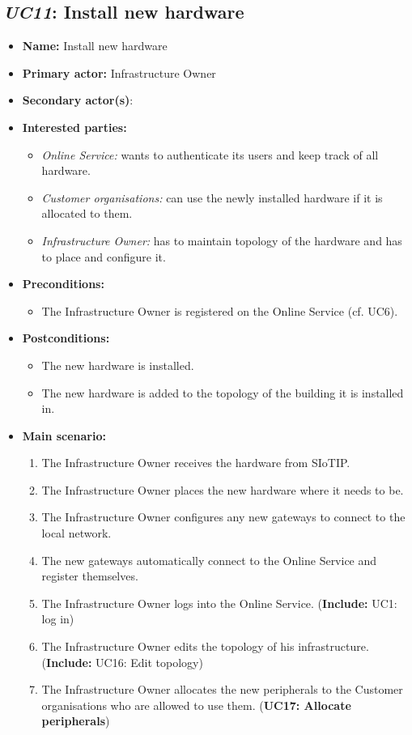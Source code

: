 \subsection{\emph{UC11}: Install new hardware}
\begin{itemize}
    \item \textbf{Name:} Install new hardware
    \item \textbf{Primary actor:} Infrastructure Owner
    \item \textbf{Secondary actor(s)}: 
    \item \textbf{Interested parties:} 
        \begin{itemize}
            \item \textit{Online Service:}  wants to authenticate its users and keep track of all hardware.
            \item \textit{Customer organisations:} can use the newly installed hardware if it is allocated to them.
            \item \textit{Infrastructure Owner:} has to maintain topology of the hardware and has to place and configure it.
        \end{itemize}

    \item \textbf{Preconditions:}
        \begin{itemize}
            \item The Infrastructure Owner is registered on the Online Service (cf. UC6).
        \end{itemize}

    \item \textbf{Postconditions:}
        \begin{itemize}
            \item The new hardware is installed.
            \item The new hardware is added to the topology of the building it is installed in.
        \end{itemize}
        
    \item \textbf{Main scenario:} 
    \begin{enumerate}
       \item The Infrastructure Owner receives the hardware from SIoTIP.
       \item The Infrastructure Owner places the new hardware where it needs to be.
       \item The Infrastructure Owner configures any new gateways to connect to the local network.
       \item The new gateways automatically connect to the Online Service and register themselves.
       \item The Infrastructure Owner logs into the Online Service. (\textbf{Include:} UC1: log in)
       \item The Infrastructure Owner edits the topology of his infrastructure. (\textbf{Include:} UC16: Edit topology)
       \item The Infrastructure Owner allocates the new peripherals to the Customer organisations who are allowed to use them. (\textbf{UC17: Allocate peripherals})
    \end{enumerate}
\end{itemize}


